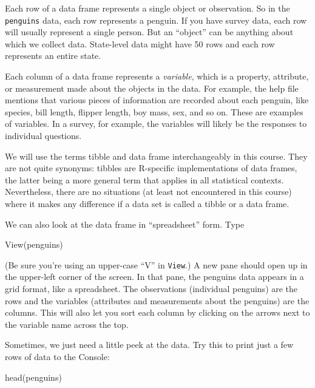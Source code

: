 \documentclass[
]{book}
\newenvironment{Shaded}{\begin{snugshade}}{\end{snugshade}}
\newcommand{\FunctionTok}[1]{\textcolor[rgb]{0.00,0.00,0.00}{#1}}
\newcommand{\NormalTok}[1]{#1}
\begin{document}
Each row of a data frame represents a single object or observation. So in the \texttt{penguins} data, each row represents a penguin. If you have survey data, each row will usually represent a single person. But an ``object'' can be anything about which we collect data. State-level data might have 50 rows and each row represents an entire state.

Each column of a data frame represents a \emph{variable}, which is a property, attribute, or measurement made about the objects in the data. For example, the help file mentions that various pieces of information are recorded about each penguin, like species, bill length, flipper length, boy mass, sex, and so on. These are examples of variables. In a survey, for example, the variables will likely be the responses to individual questions.

We will use the terms tibble and data frame interchangeably in this course. They are not quite synonyms: tibbles are R-specific implementations of data frames, the latter being a more general term that applies in all statistical contexts. Nevertheless, there are no situations (at least not encountered in this course) where it makes any difference if a data set is called a tibble or a data frame.

We can also look at the data frame in ``spreadsheet'' form. Type

\begin{Shaded}
\begin{Highlighting}[]
\FunctionTok{View}\NormalTok{(penguins)}
\end{Highlighting}
\end{Shaded}

(Be sure you're using an upper-case ``V'' in \texttt{View}.) A new pane should open up in the upper-left corner of the screen. In that pane, the penguins data appears in a grid format, like a spreadsheet. The observations (individual penguins) are the rows and the variables (attributes and measurements about the penguins) are the columns. This will also let you sort each column by clicking on the arrows next to the variable name across the top.

Sometimes, we just need a little peek at the data. Try this to print just a few rows of data to the Console:

\begin{Shaded}
\begin{Highlighting}[]
\FunctionTok{head}\NormalTok{(penguins)}
\end{Highlighting}
\end{Shaded}
\end{document}
